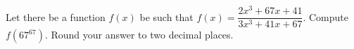 Let there be a function $f(x)$ be such that $f(x)=\dfrac{2x^3+67x+41}{3x^3+41x+67}$. Compute $f(67^{67})$. Round your answer to two decimal places.
